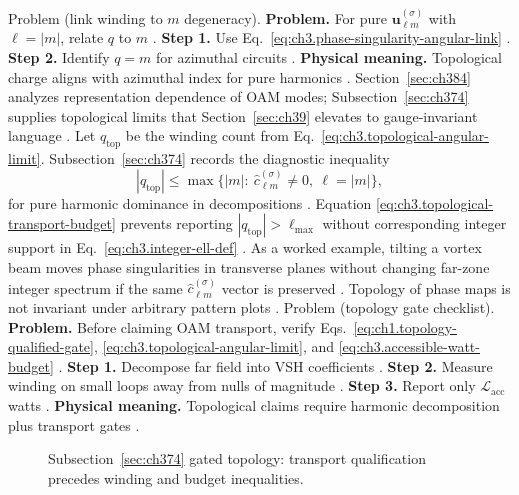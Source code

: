 Problem (link winding to \(m\) degeneracy). \textbf{Problem.} For pure \(\mathbf{u}_{\ell m}^{(\sigma)}\) with \(\ell=|m|\), relate \(q\) to \(m\)
\cite{allen1992}.
\textbf{Step 1.} Use Eq.~\eqref{eq:ch3.phase-singularity-angular-link} \cite{hansen1988}.
\textbf{Step 2.} Identify \(q=m\) for azimuthal circuits \cite{jackson1999}.
\textbf{Physical meaning.} Topological charge aligns with azimuthal index for pure harmonics \cite{allen1992}.
Section~\ref{sec:ch384} analyzes representation dependence of OAM modes; Subsection~\ref{sec:ch374} supplies topological
limits that Section~\ref{sec:ch39} elevates to gauge-invariant language \cite{belinfante1940}.
Let \(q_{\mathrm{top}}\) be the winding count from Eq.~\eqref{eq:ch3.topological-angular-limit}. Subsection~\ref{sec:ch374}
records the diagnostic inequality
\begin{equation}
\label{eq:ch3.topological-transport-budget}
|q_{\mathrm{top}}|
\le
\max\{|m|:\ \widehat{c}_{\ell m}^{(\sigma)}\neq0,\ \ell=|m|\},
\end{equation}
for pure harmonic dominance in decompositions \cite{allen1992}. Equation
\eqref{eq:ch3.topological-transport-budget} prevents reporting \(|q_{\mathrm{top}}|> \ell_{\max}\) without corresponding
integer support in Eq.~\eqref{eq:ch3.integer-ell-def} \cite{stratton1941}.
As a worked example, tilting a vortex beam moves phase singularities in transverse planes without changing far-zone integer spectrum if the same
\(\widehat{c}_{\ell m}^{(\sigma)}\) vector is preserved \cite{allen1992}. Topology of phase maps is
not invariant under arbitrary pattern plots \cite{harrington2001}.
Problem (topology gate checklist). \textbf{Problem.} Before claiming OAM transport, verify Eqs.~\eqref{eq:ch1.topology-qualified-gate}, \eqref{eq:ch3.topological-angular-limit},
and \eqref{eq:ch3.accessible-watt-budget} \cite{belinfante1940}.
\textbf{Step 1.} Decompose far field into VSH coefficients \cite{hansen1988}.
\textbf{Step 2.} Measure winding on small loops away from nulls of magnitude \cite{allen1992}.
\textbf{Step 3.} Report only \(\mathcal{L}_{\mathrm{acc}}\) watts \cite{harrington2001}.
\textbf{Physical meaning.} Topological claims require harmonic decomposition plus transport gates \cite{belinfante1940}.
\begin{figure}[t]
\centering
{}
\caption{Subsection~\ref{sec:ch374} gated topology: transport qualification precedes winding and budget inequalities.}
\label{fig:ch3.374-gated-topology}
\end{figure}
